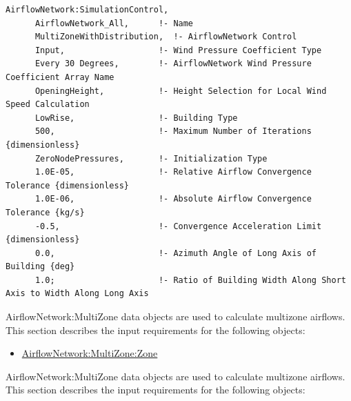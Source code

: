 \begin{lstlisting}
AirflowNetwork:SimulationControl,
      AirflowNetwork_All,      !- Name
      MultiZoneWithDistribution,  !- AirflowNetwork Control
      Input,                   !- Wind Pressure Coefficient Type
      Every 30 Degrees,        !- AirflowNetwork Wind Pressure Coefficient Array Name
      OpeningHeight,           !- Height Selection for Local Wind Speed Calculation
      LowRise,                 !- Building Type
      500,                     !- Maximum Number of Iterations {dimensionless}
      ZeroNodePressures,       !- Initialization Type
      1.0E-05,                 !- Relative Airflow Convergence Tolerance {dimensionless}
      1.0E-06,                 !- Absolute Airflow Convergence Tolerance {kg/s}
      -0.5,                    !- Convergence Acceleration Limit {dimensionless}
      0.0,                     !- Azimuth Angle of Long Axis of Building {deg}
      1.0;                     !- Ratio of Building Width Along Short Axis to Width Along Long Axis
\end{lstlisting}

AirflowNetwork:MultiZone data objects are used to calculate multizone airflows. This section describes the input requirements for the following objects:

\begin{itemize}
\tightlist
\item
  \hyperref[airflownetworkmultizonezone]{AirflowNetwork:MultiZone:Zone}
\end{itemize}

AirflowNetwork:MultiZone data objects are used to calculate multizone airflows. This section describes the input requirements for the following objects:

